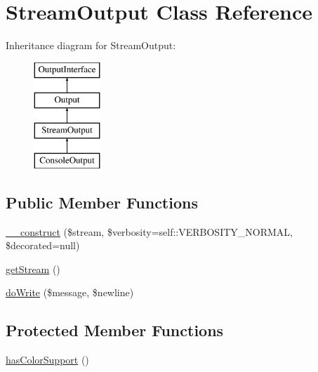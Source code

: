 \hypertarget{class_symfony_1_1_components_1_1_console_1_1_output_1_1_stream_output}{
\section{StreamOutput Class Reference}
\label{class_symfony_1_1_components_1_1_console_1_1_output_1_1_stream_output}
}
Inheritance diagram for StreamOutput:\begin{figure}[H]
\begin{center}
\leavevmode
\includegraphics[height=4.000000cm]{class_symfony_1_1_components_1_1_console_1_1_output_1_1_stream_output}
\end{center}
\end{figure}
\subsection*{Public Member Functions}
\begin{DoxyCompactItemize}
\item 
\hyperlink{class_symfony_1_1_components_1_1_console_1_1_output_1_1_stream_output_a959abad15338e0e09212fc15d8fbcba3}{\_\-\_\-construct} (\$stream, \$verbosity=self::VERBOSITY\_\-NORMAL, \$decorated=null)
\item 
\hyperlink{class_symfony_1_1_components_1_1_console_1_1_output_1_1_stream_output_a3e5834ff3daeecd091712270886a16fb}{getStream} ()
\item 
\hyperlink{class_symfony_1_1_components_1_1_console_1_1_output_1_1_stream_output_ab7c4cdd27091c71fb685f223042a6d82}{doWrite} (\$message, \$newline)
\end{DoxyCompactItemize}
\subsection*{Protected Member Functions}
\begin{DoxyCompactItemize}
\item 
\hyperlink{class_symfony_1_1_components_1_1_console_1_1_output_1_1_stream_output_a8e041c5c822c549689dd51c5419cfcf3}{hasColorSupport} ()
\end{DoxyCompactItemize}
